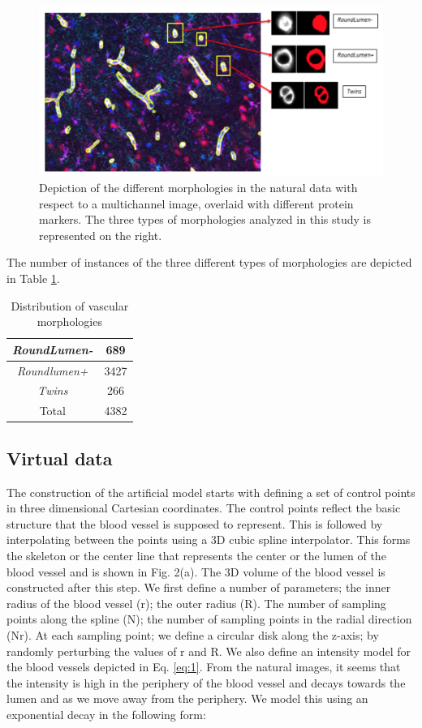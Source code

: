 \begin{figure}[H]
\centering
\includegraphics[width=1.0\textwidth]{img/morphologies}
\caption{Depiction of the different morphologies in the natural data with respect to a multichannel image, overlaid with different protein markers. The three types of morphologies analyzed in this study is represented on the right.}
\label{fig:morphologies}
\end{figure}

The number of instances of the three different types of morphologies are depicted in Table \ref{table:classes}.
\begin{table}
\label{table:classes}
\caption{Distribution of vascular morphologies}
\centering
\begin{tabular}{ | c | c |} 
\hline
\textit{RoundLumen-} & 689 \\ 
\hline
\textit{Roundlumen+} & 3427 \\ 
\hline
\textit{Twins} & 266 \\ 
\hline
Total & 4382 \\ 
\hline
\end{tabular}
\end{table}

\subsection{Virtual data}
The construction of the artificial model starts with defining a set of control points in three dimensional Cartesian coordinates. The control points reflect the basic structure that the blood vessel is supposed to represent. This is followed by interpolating between the points using a 3D cubic spline interpolator. This forms the skeleton or the center line that represents the center or the lumen of the blood vessel and is shown in Fig. 2(a). The 3D volume of the blood vessel is constructed after this step. We first define a number of parameters; the inner radius of the blood vessel (r); the outer radius (R). The number of sampling points along the spline (N); the number of sampling points in the radial direction (Nr). At each sampling point; we define a circular disk along the z-axis; by randomly perturbing the values of r and R. We also define an intensity model for the blood vessels depicted in Eq. \ref{eq:1}. From the natural images, it seems that the intensity is high in the periphery of the blood vessel and decays towards the lumen and as we move away from the periphery. We model this using an exponential decay in the following form:

